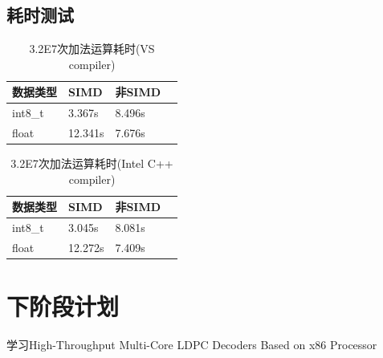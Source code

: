 \documentclass{article}
\begin{document}
\subsection{耗时测试}
\begin{table}[H]
	\caption{3.2E7次加法运算耗时(VS compiler)}
	\centering
	\begin{tabular}{|l|l|l|l|}%
		\hline  %
		数据类型 & SIMD		& 非SIMD  \\
		\hline
		int8\_t	& 3.367s	& 8.496s \\
		\hline
		float	& 12.341s	& 7.676s \\
		\hline  %
	\end{tabular}
\end{table}
\begin{table}[H]
	\caption{3.2E7次加法运算耗时(Intel C++ compiler)}
	\centering
	\begin{tabular}{|l|l|l|l|}%
		\hline  %
		数据类型 & SIMD		& 非SIMD  \\
		\hline
		int8\_t	& 3.045s	& 8.081s \\
		\hline
		float	& 12.272s	& 7.409s \\
		\hline  %
	\end{tabular}
\end{table}



\section{下阶段计划}
学习High-Throughput Multi-Core LDPC Decoders Based on x86 Processor
\end{document}
